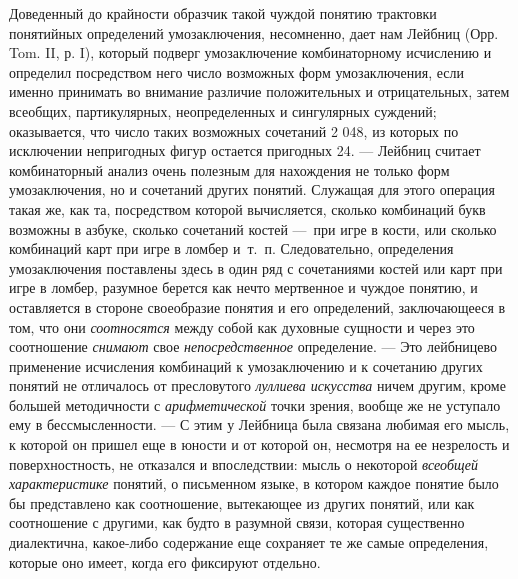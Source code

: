 \documentclass[twoside]{article}
\begin{document}
{{{{{Доведенный до крайности образчик такой чуждой понятию
трактовки понятийных определений умозаключения, несомненно, дает нам Лейбниц
(Орр. Tom. II, р. I), который подверг умозаключение
комбинаторному исчислению и определил посредством него число возможных форм
умозаключения, если именно принимать во внимание различие положительных и
отрицательных, затем всеобщих, партикулярных, неопределенных и сингулярных
суждений; оказывается, что число таких возможных сочетаний 2 048, из
которых по исключении непригодных фигур остается пригодных 24. —
Лейбниц считает комбинаторный анализ очень полезным для
нахождения не только форм умозаключения, но и сочетаний других понятий.
Служащая для этого операция такая же, как та, посредством которой
вычисляется, сколько комбинаций букв возможны в азбуке, сколько сочетаний
костей —~при игре в кости, или сколько комбинаций карт при
игре в ломбер и~т.~п. Следовательно, определения умозаключения поставлены
здесь в один ряд с сочетаниями костей или карт при игре в ломбер, разумное
берется как нечто мертвенное и чуждое понятию, и оставляется в стороне
своеобразие понятия и его определений, заключающееся в том, что они
{\em соотносятся} между
собой как духовные сущности и через это соотношение
{\em снимают} свое
{\em непосредственное}
определение. — Это лейбницево
применение исчисления комбинаций к умозаключению и к сочетанию других
понятий не отличалось от пресловутого
{\em луллиева искусства}
ничем другим, кроме большей методичности с
{\em арифметической}
точки зрения, вообще же не уступало ему в бессмысленности. —
С этим у Лейбница была связана любимая его мысль, к которой
он пришел еще в юности и от которой он, несмотря на ее незрелость и
поверхностность, не отказался и впоследствии: мысль о некоторой
{\em всеобщей характеристике}
понятий, о письменном языке, в котором каждое понятие было бы
представлено как соотношение, вытекающее из других понятий, или как
соотношение с другими, как будто в разумной связи, которая существенно
диалектична, какое-либо содержание еще сохраняет те же самые определения,
которые оно имеет, когда его фиксируют отдельно.

}}}}}
\end{document}
